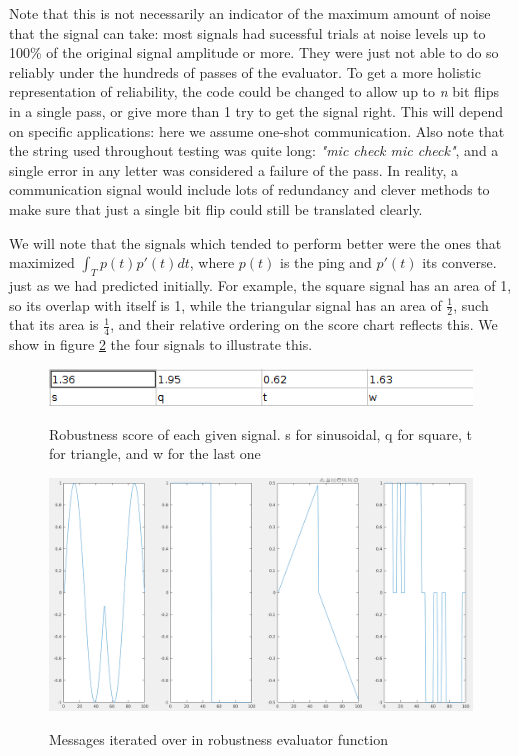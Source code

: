 \documentclass{article}
\begin{document}
Note that this is not necessarily an indicator of the maximum amount of noise that the signal can take: most signals had sucessful trials at noise levels up to 100\% of the original signal amplitude or more. They were just not able to do so reliably under the hundreds of passes of the evaluator.
To get a more holistic representation of reliability, the code could be changed to allow up to \emph{n} bit flips in a single pass, or give more than 1 try to get the signal right. This will depend on specific applications: here we assume one-shot communication.
Also note that the string used throughout testing was quite long: \emph{"mic check mic check"}, and a single error in any letter was considered a failure of the pass. In reality, a communication signal would include lots of redundancy and clever methods to make sure that just a single bit flip could still be translated clearly.

We will note that the signals which tended to perform better were the ones that maximized $\int_{T}p(t)p'(t)dt$, where $p(t)$ is the ping and $p'(t)$ its converse. just as we had predicted initially.
For example, the square signal has an area of 1, so its overlap with itself is 1, while the triangular signal has an area of $\frac{1}{2}$, such that its area is $\frac{1}{4}$, and their relative ordering on the score chart reflects this. We show in figure \ref{pings} the four signals to illustrate this.

\begin{figure}[h]
	\includegraphics[width =\textwidth]{sensitivities.png}
	\label{sensitivities}
	\caption{Robustness score of each given signal. s for sinusoidal, q for square, t for triangle, and w for the last one}
\end{figure}
\begin{figure}[h]
	\includegraphics[width =\textwidth]{pings.png}
	\label{pings}
	\caption{Messages iterated over in robustness evaluator function}
\end{figure}
\end{document}
